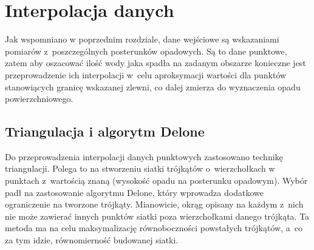 \chapter{Interpolacja danych}
Jak wspomniano w poprzednim rozdziale, dane wejściowe są wskazaniami pomiarów z~poszczególnych posterunków opadowych. Są to dane punktowe, zatem aby oszacować ilość wody jaka spadła na zadanym obszarze konieczne jest przeprowadzenie ich interpolacji w~celu aproksymacji wartości dla punktów stanowiących granicę wskazanej zlewni, co dalej zmierza do wyznaczenia opadu powierzchniowego.

\section{Triangulacja i algorytm Delone}
Do przeprowadzenia interpolacji danych punktowych zastosowano technikę triangulacji. Polega to na stworzeniu siatki trójkątów o~wierzchołkach w punktach z~wartością znaną (wysokość opadu na posterunku opadowym). Wybór padł na zastosowanie algorytmu Delone, który wprowadza dodatkowe ograniczenie na tworzone trójkąty. Mianowicie, okrąg opisany na każdym z~nich nie może zawierać innych punktów siatki poza wierzchołkami danego trójkąta. Ta metoda ma na celu maksymalizację równoboczności powstałych trójkątów, a~co za tym idzie, równomierność budowanej siatki.
